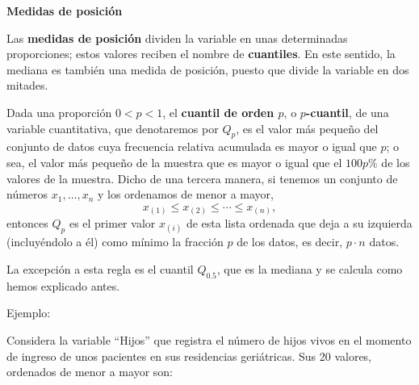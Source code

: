 \documentclass[
  spanish,
  letterpaper,
  DIV=11,
  numbers=noendperiod]{scrreprt}
\begin{document}
\textbf{Medidas de posición}

Las \textbf{medidas de posición} dividen la variable en unas
determinadas proporciones; estos valores reciben el nombre de
\textbf{cuantiles}. En este sentido, la mediana es también una medida de
posición, puesto que divide la variable en dos mitades.

Dada una proporción \(0<p<1\), el \textbf{cuantil de orden \(p\)}, o
\textbf{\(p\)-cuantil}, de una variable cuantitativa, que denotaremos
por \(Q_p\), es el valor más pequeño del conjunto de datos cuya
frecuencia relativa acumulada es mayor o igual que \(p\); o sea, el
valor más pequeño de la muestra que es mayor o igual que el \(100p\%\)
de los valores de la muestra. Dicho de una tercera manera, si tenemos un
conjunto de números \(x_1, \ldots, x_n\) y los ordenamos de menor a
mayor, \[
x_{(1)}\leqslant x_{(2)}\leqslant \cdots \leqslant x_{(n)},
\] entonces \(Q_p\) es el primer valor \(x_{(i)}\) de esta lista
ordenada que deja a su izquierda (incluyéndolo a él) como mínimo la
fracción \(p\) de los datos, es decir, \(p\cdot n\) datos.

La excepción a esta regla es el cuantil \(Q_{0.5}\), que es la mediana y
se calcula como hemos explicado antes.

Ejemplo:

Considera la variable ``Hijos'' que registra el número de hijos vivos en
el momento de ingreso de unos pacientes en sus residencias geriátricas.
Sus 20 valores, ordenados de menor a mayor son:
\end{document}
